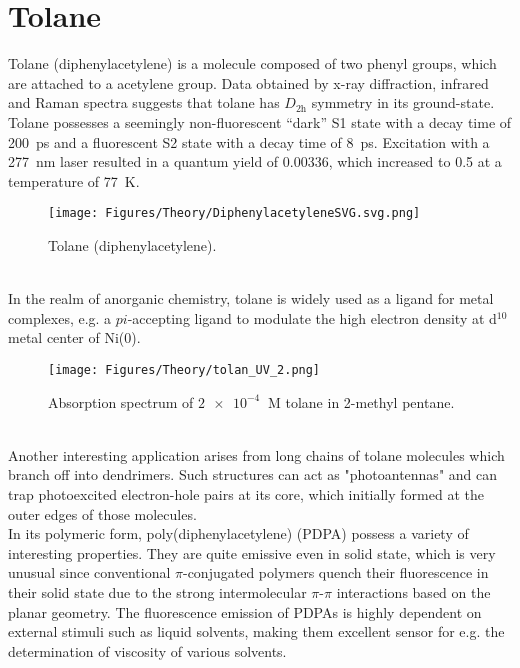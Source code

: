 \section{Tolane}
Tolane (diphenylacetylene) is a molecule composed of two phenyl groups, which are attached to a acetylene group. Data obtained by x-ray diffraction\cite{tol_xray}, infrared\cite{tol_infra} and Raman\cite{tol_raman} spectra suggests that tolane has $D_{2\mathrm{h}}$ symmetry in its ground-state. Tolane possesses a seemingly non-fluorescent ``dark'' S1 state with a decay time of \SI{200}{\pico\second}
and a fluorescent S2 state with a decay time of \SI{8}{\pico\second}.\cite{tol_states} Excitation with a \SI{277}{\nano\meter} laser resulted in a quantum yield of 0.00336, which increased to 0.5 at a temperature of \SI{77}{K}.\cite{tol_1}
%
%
\begin{figure}[h]
\centering
\texttt{[image: Figures/Theory/DiphenylacetyleneSVG.svg.png]}
\caption{Tolane (diphenylacetylene).}
\label{fig:tolane}
\end{figure}\\
%
In the realm of anorganic chemistry, tolane is widely used as a ligand for metal complexes, e.g. a $pi$-accepting ligand to modulate the high electron density at d$^{10}$ metal center of Ni(0).\cite{tol_ligand} \\
%
\begin{figure}[h]
\centering
\texttt{[image: Figures/Theory/tolan\_UV\_2.png]}
\caption{Absorption spectrum of $\SI{2e-4}{}$ M tolane in 2-methyl pentane.\cite{tol_uv_spec}}
\label{fig:tolane_UV}
\end{figure}\\
%
Another interesting application arises from long chains of tolane molecules which branch off into dendrimers. 
Such structures can act as "photoantennas" and can trap photoexcited electron-hole pairs at its core, which initially formed at the outer edges of those molecules.\cite{tol_dendrimer}\\
In its polymeric form, poly(diphenylacetylene) (PDPA) possess a variety of interesting properties. They are quite emissive even in solid state,\cite{tol_emission} which is very unusual since conventional $\pi$-conjugated polymers quench their fluorescence in their solid state due to the strong intermolecular $\pi$-$\pi$ interactions based on the planar geometry.\cite{tol_pi_polymer} The fluorescence emission of PDPAs is highly dependent on external stimuli such as liquid solvents, making them excellent sensor for e.g. the determination of viscosity of various solvents.\cite{tol_sensor}




